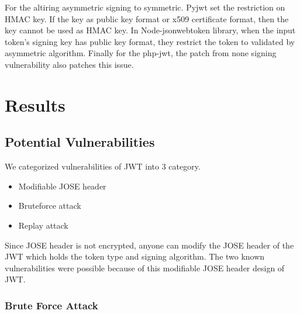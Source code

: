 \documentclass[journal,article,submit,moreauthors,pdftex,10pt,a4paper]{mdpi}
\begin{document}
For the altiring asymmetric signing to symmetric. Pyjwt set the restriction on HMAC key. If the key as public key format or x509 certificate format, then the key cannot be used as HMAC key. In Node-jsonwebtoken library, when the input token's signing key has public key format, they restrict the token to validated by asymmetric algorithm. Finally for the php-jwt, the patch from none signing vulnerability also patches this issue.


\section{Results}
\subsection{Potential Vulnerabilities}
We categorized vulnerabilities of JWT into 3 category.
\begin{itemize}[leftmargin=*,labelsep=4mm]
\item Modifiable JOSE header
\item Bruteforce attack
\item Replay attack
\end{itemize}

Since JOSE header is not encrypted, anyone can modify the JOSE header of the JWT which holds the token type and signing algorithm. The two known vulnerabilities were possible because of this modifiable JOSE header design of JWT.


\subsubsection{Brute Force Attack}
\end{document}
